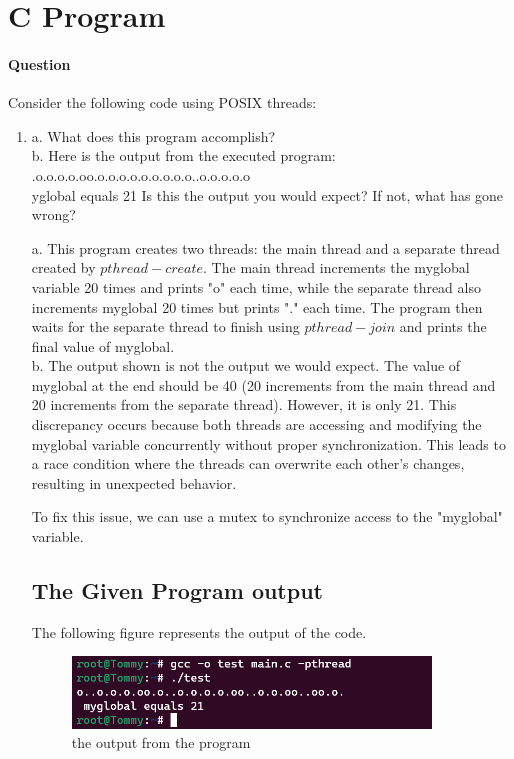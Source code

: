 \documentclass[a4paper,12pt,fleqn]{article}
\newcounter{question}
\newcommand*\question{%
\stepcounter{question}%
\paragraph{Question \thequestion}}
\begin{document}
\section{C Program}
\question
{
Consider the following code using POSIX threads:
}
\begin{enumerate}

\item
{
a. What does this program accomplish?\\
b. Here is the output from the executed program:\\
{.o.o.o.o.oo.o.o.o.o.o.o.o.o.o..o.o.o.o.o\\
yglobal equals 21}
Is this the output you would expect? If not, what has gone wrong?
}
\begin{answer}
	{
	a. This program creates two threads: the main thread and a separate thread created by $pthread- create$. The main thread increments the myglobal variable 20 times and prints "o" each time, while the separate thread also increments myglobal 20 times but prints "." each time. The program then waits for the separate thread to finish using $pthread-  join$ and prints the final value of myglobal.\\
	
	b. The output shown is not the output we would expect. The value of myglobal at the end should be 40 (20 increments from the main thread and 20 increments from the separate thread). However, it is only 21. This discrepancy occurs because both threads are accessing and modifying the myglobal variable concurrently without proper synchronization. This leads to a race condition where the threads can overwrite each other's changes, resulting in unexpected behavior.
	
	To fix this issue, we can use a mutex to synchronize access to the "myglobal" variable.
}
\end{answer}
	\subsection{The Given Program output}
	The following figure represents the output of the code.
	\begin{figure}[h]
	\centering
	\includegraphics[width=0.9\textwidth]{output.png}
	\caption{the output from the program}
	\label{fig:terminal output}
	\end{figure}


\end{enumerate}
\end{document}
